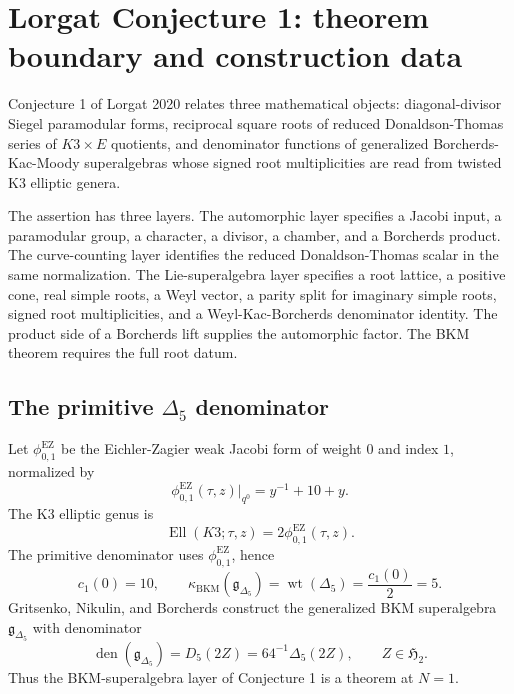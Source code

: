 
\providecommand{\cO}{\mathcal{O}}
\providecommand{\fg}{\mathfrak{g}}
\providecommand{\Ell}{\operatorname{Ell}}
\providecommand{\wt}{\operatorname{wt}}
\providecommand{\kBKM}{\kappa_{\mathrm{BKM}}}
\providecommand{\kch}{\kappa_{\mathrm{ch}}}
\providecommand{\kcat}{\kappa_{\mathrm{cat}}}
\providecommand{\kfib}{\kappa_{\mathrm{fiber}}}
\providecommand{\gDelta}{\mathfrak{g}_{\Delta_5}}

\section{Lorgat Conjecture 1: theorem boundary and construction data}
\label{sec:lorgat-conjecture-one-theorem-boundary}

Conjecture 1 of Lorgat 2020 relates three mathematical objects:
diagonal-divisor Siegel paramodular forms, reciprocal square roots of
reduced Donaldson-Thomas series of \(K3\times E\) quotients, and
denominator functions of generalized Borcherds-Kac-Moody superalgebras
whose signed root multiplicities are read from twisted K3 elliptic
genera.

The assertion has three layers. The automorphic layer specifies a
Jacobi input, a paramodular group, a character, a divisor, a chamber,
and a Borcherds product. The curve-counting layer identifies the
reduced Donaldson-Thomas scalar in the same normalization. The
Lie-superalgebra layer specifies a root lattice, a positive cone, real
simple roots, a Weyl vector, a parity split for imaginary simple roots,
signed root multiplicities, and a Weyl-Kac-Borcherds denominator
identity. The product side of a Borcherds lift supplies the
automorphic factor. The BKM theorem requires the full root datum.

\subsection{The primitive \texorpdfstring{\(\Delta_5\)}{Delta5} denominator}
\label{subsec:lorgat-conjecture-one-delta-five}

\begin{theorem}[The constructed denominator at \(N=1\)]
\label{thm:lorgat-conjecture-one-delta-five}
Let \(\phi_{0,1}^{\mathrm{EZ}}\) be the Eichler-Zagier weak Jacobi
form of weight \(0\) and index \(1\), normalized by
\[
  \phi_{0,1}^{\mathrm{EZ}}(\tau,z)\big|_{q^0}
  = y^{-1}+10+y .
\]
The K3 elliptic genus is
\[
  \Ell(K3;\tau,z)=2\phi_{0,1}^{\mathrm{EZ}}(\tau,z).
\]
The primitive denominator uses \(\phi_{0,1}^{\mathrm{EZ}}\), hence
\[
  c_1(0)=10,\qquad
  \kBKM(\gDelta)
  =
  \wt(\Delta_5)
  =
  \frac{c_1(0)}{2}
  =
  5 .
\]
Gritsenko, Nikulin, and Borcherds construct the generalized BKM
superalgebra \(\gDelta\) with denominator
\[
  \operatorname{den}(\gDelta)=D_5(2Z)=64^{-1}\Delta_5(2Z),
  \qquad Z\in\mathfrak H_2 .
\]
Thus the BKM-superalgebra layer of Conjecture 1 is a theorem at
\(N=1\).
\end{theorem}

